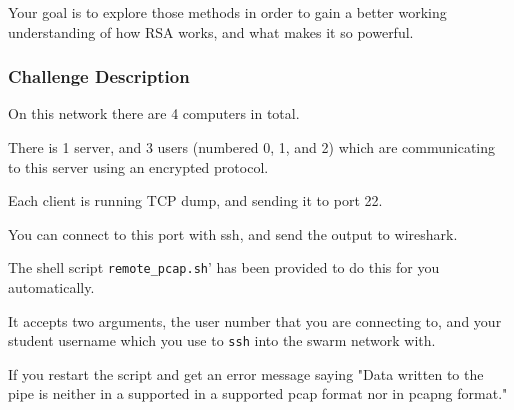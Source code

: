 {                    Your goal is to explore those methods in order to gain a better working understanding of how RSA works, and what makes it so powerful. 







                \subsubsection*{Challenge Description}







                    On this network there are 4 computers in total. 







                    There is 1 server, and 3 users (numbered 0, 1, and 2) which are communicating to this server using an encrypted protocol. 







                    Each client is running TCP dump, and sending it to port 22. %







You can connect to this port with ssh, and send the output to wireshark.







                    The shell script \lstinline`remote_pcap.sh`' has been provided to do this for you automatically. 







                    It accepts two arguments, the user number that you are connecting to, and your student username which you use to \lstinline`ssh` into the swarm network with.







                    If you restart the script and get an error message saying "Data written to the pipe is neither in a supported in a supported pcap format nor in pcapng format."







}
